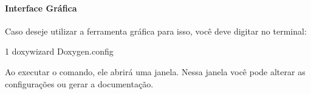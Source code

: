 \paragraph*{Interface Gráfica}

Caso deseje utilizar a ferramenta gráfica para isso, você deve digitar no terminal\+:


\begin{DoxyCode}
1 doxywizard Doxygen.config
\end{DoxyCode}


Ao executar o comando, ele abrirá uma janela. Nessa janela você pode alterar as configurações ou gerar a documentação. 